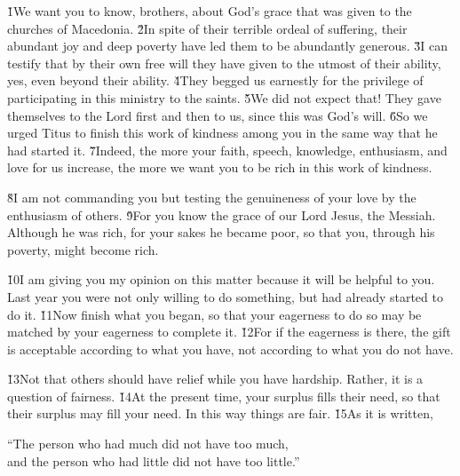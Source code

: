 \v{1}We want you to know, brothers, about God's grace that was given to the churches of Macedonia. \v{2}In spite of their terrible ordeal of suffering, their abundant joy and deep poverty have led them to be abundantly generous. \v{3}I can testify that by their own free will they have given to the utmost of their ability, yes, even beyond their ability. \v{4}They begged us earnestly for the privilege of participating in this ministry to the saints. \v{5}We did not expect that! They gave themselves to the Lord first and then to us, since this was God's will. \v{6}So we urged Titus to finish this work of kindness among you in the same way that he had started it. \v{7}Indeed, the more your faith, speech, knowledge, enthusiasm, and love for us increase, the more we want you to be rich in this work of kindness.

\v{8}I am not commanding you but testing the genuineness of your love by the enthusiasm of others. \v{9}For you know the grace of our Lord Jesus, the Messiah. Although he was rich, for your sakes he became poor, so that you, through his poverty, might become rich.

\v{10}I am giving you my opinion on this matter because it will be helpful to you. Last year you were not only willing to do something, but had already started to do it. \v{11}Now finish what you began, so that your eagerness to do so may be matched by your eagerness to complete it. \v{12}For if the eagerness is there, the gift is acceptable according to what you have, not according to what you do not have.

\v{13}Not that others should have relief while you have hardship. Rather, it is a question of fairness. \v{14}At the present time, your surplus fills their need, so that their surplus may fill your need. In this way things are fair. \v{15}As it is written,

\begin{poetry}
\poeml ``The person who had much did not have too much, \\
\poemll    and the person who had little did not have too little.''
\end{poetry}

